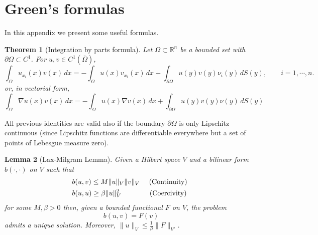 \documentclass{article}
\newtheorem{thm}{Theorem}[section]
\newtheorem{lemma}[thm]{Lemma}
\begin{document}
\appendix
\section{Green's formulas}
In this appendix we present some useful formulas.


\begin{thm}[Integration by parts formula] \label{thm:by_parts}
Let $\Omega \subset \mathbb{R}^n$ be a bounded set with $\partial\Omega \subset C^1$. For $u, v \in C^1(\bar{\Omega})$,
\[
\int_\Omega u_{x_i}(x)v(x)\,dx = -\int_\Omega u(x)v_{x_i}(x)\,dx + \int_{\partial\Omega} u(y)v(y)\nu_i(y)\,dS(y), \qquad i = 1, \cdots, n.
\]
or, in vectorial form,
\[
\int_\Omega \nabla u(x)v(x)\,dx = -\int_\Omega u(x)\nabla v(x)\,dx + \int_{\partial\Omega} u(y)v(y)\nu(y)\,dS(y)
\]
\end{thm}


All previous identities are valid also if the boundary $\partial\Omega$ is only Lipschitz continuous (since Lipschitz functions are differentiable everywhere but a set of points of Lebesgue measure zero).


\begin{lemma}[Lax-Milgram Lemma]\label{lemma:lax_mil}
    Given a Hilbert space $V$ and a bilinear form $b(\cdot, \cdot)$ on $V$ such that
    \begin{align*}
        & b(u,v) \leq M \| u\|_V \| v\|_V \quad \text{ (Continuity) }\\
        &b(u,u) \geq \beta \| u\|_V^2 \qquad \hspace{6mm} \text{ (Coercivity) }
    \end{align*}
    for some $M,\beta>0$ then, given a bounded functional $F$ on $V$, the problem
    \begin{equation*}
        b(u,v) = F(v)
    \end{equation*}
    admits a unique solution. Moreover, $\| u\|_V \leq \frac{1}{\beta} \| F\|_{V'}$.
\end{lemma}

    
\end{document}
